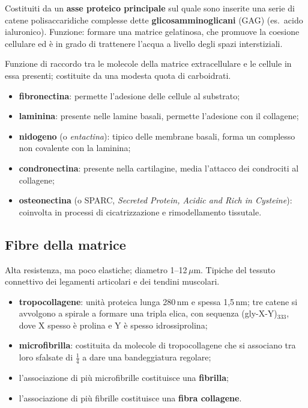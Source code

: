 Costituiti da un \textbf{asse proteico principale} sul quale sono inserite una serie di catene polisaccaridiche complesse dette \textbf{glicosamminoglicani} (GAG) (es.\ acido ialuronico). Funzione: formare una matrice gelatinosa, che promuove la coesione cellulare ed è in grado di trattenere l'acqua a livello degli spazi interstiziali.

Funzione di raccordo tra le molecole della matrice extracellulare e le cellule in essa presenti; costituite da una modesta quota di carboidrati.
\begin{itemize}
  \item \textbf{fibronectina}: permette l'adesione delle cellule al substrato;
  \item \textbf{laminina}: presente nelle lamine basali, permette l'adesione con il collagene;
  \item \textbf{nidogeno} (o \textit{entactina}): tipico delle membrane basali, forma un complesso non covalente con la laminina;
  \item \textbf{condronectina}: presente nella cartilagine, media l'attacco dei condrociti al collagene;
  \item \textbf{osteonectina} (o SPARC, \textit{Secreted Protein, Acidic and Rich in Cysteine}): coinvolta in processi di cicatrizzazione e rimodellamento tissutale.
\end{itemize}

\subsection{Fibre della matrice}

Alta resistenza, ma poco elastiche; diametro 1--12\,$\mu$m. Tipiche del tessuto connettivo dei legamenti articolari e dei tendini muscolari.
\begin{itemize}
  \item \textbf{tropocollagene}: unità proteica lunga 280\,nm e spessa 1,5\,nm; tre catene si avvolgono a spirale a formare una tripla elica, con sequenza (gly-X-Y)$_{333}$, dove X spesso è prolina e Y è spesso idrossiprolina;
  \item \textbf{microfibrilla}: costituita da molecole di tropocollagene che si associano tra loro sfalsate di $\frac{1}{4}$ a dare una bandeggiatura regolare;
  \item l'associazione di più microfibrille costituisce una \textbf{fibrilla};
  \item l'associazione di più fibrille costituisce una \textbf{fibra collagene}.
\end{itemize}

